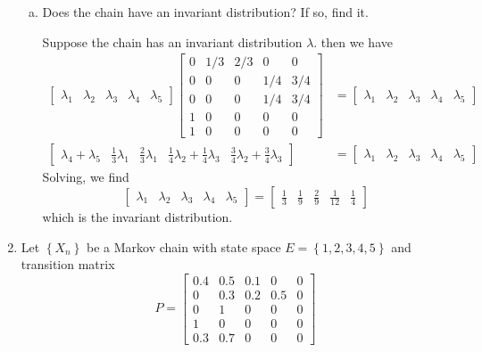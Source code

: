 \documentclass{article}
\begin{document}
\begin{enumerate}
\begin{enumerate}[(a)]
			\item Does the chain have an invariant distribution? If so, find it.
				\begin{soln}
					Suppose the chain has an invariant distribution $\lambda.$ then we have
					\begin{align*}
						\begin{bmatrix}
							\lambda_1 & \lambda_2 & \lambda_3 & \lambda_4 & \lambda_5
						\end{bmatrix}\begin{bmatrix}
							0 & 1/3 & 2/3 & 0 & 0 \\
							0 & 0 & 0 & 1/4 & 3/4 \\
							0 & 0 & 0 & 1/4 & 3/4 \\
							1 & 0 & 0 & 0 & 0 \\
							1 & 0 & 0 & 0 & 0
						\end{bmatrix}&=\begin{bmatrix}
							\lambda_1 & \lambda_2 & \lambda_3 & \lambda_4 & \lambda_5
						\end{bmatrix} \\
						\begin{bmatrix}
							\lambda_4+\lambda_5 & \frac{1}{3}\lambda_1 & \frac{2}{3}\lambda_1 & \frac{1}{4}\lambda_2 + \frac{1}{4}\lambda_3 & \frac{3}{4}\lambda_2+\frac{3}{4}\lambda_3
						\end{bmatrix} &= \begin{bmatrix}
							\lambda_1 & \lambda_2 & \lambda_3 & \lambda_4 & \lambda_5
						\end{bmatrix}
					\end{align*}
					Solving, we find
					\[\begin{bmatrix}
							\lambda_1 & \lambda_2 & \lambda_3 & \lambda_4 & \lambda_5
						\end{bmatrix} = \begin{bmatrix}
							\frac{1}{3} & \frac{1}{9} & \frac{2}{9} & \frac{1}{12} & \frac{1}{4}
					\end{bmatrix}\]
					which is the invariant distribution.
				\end{soln}

		\end{enumerate}

	\item Let $\left\{ X_n \right\}$ be a Markov chain with state space $E=\left\{ 1, 2, 3, 4, 5 \right\}$ and transition matrix
		\[P=\begin{bmatrix}
				0.4 & 0.5 & 0.1 & 0 & 0 \\
				0 & 0.3 & 0.2 & 0.5 & 0 \\
				0 & 1 & 0 & 0 & 0 \\
				1 & 0 & 0 & 0 & 0 \\
				0.3 & 0.7 & 0 & 0 & 0
		\end{bmatrix}\]


\end{enumerate}
\end{document}
